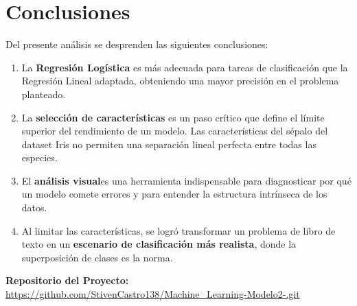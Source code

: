 \documentclass[12pt,a4paper]{article}
\begin{document}
\section{Conclusiones}
Del presente análisis se desprenden las siguientes conclusiones:
\begin{enumerate}
    \item La \textbf{Regresión Logística} es más adecuada para tareas de clasificación que la Regresión Lineal adaptada, obteniendo una mayor precisión en el problema planteado.
    \item La \textbf{selección de características} es un paso crítico que define el límite superior del rendimiento de un modelo. Las características del sépalo del dataset Iris no permiten una separación lineal perfecta entre todas las especies.
    \item El \textbf{análisis visual}es una herramienta indispensable para diagnosticar por qué un modelo comete errores y para entender la estructura intrínseca de los datos.
    \item Al limitar las características, se logró transformar un problema de libro de texto en un \textbf{escenario de clasificación más realista}, donde la superposición de clases es la norma.
\end{enumerate}

\textbf{Repositorio del Proyecto:} 
\url{https://github.com/StivenCastro138/Machine_Learning-Modelo2-.git}
\end{document}
